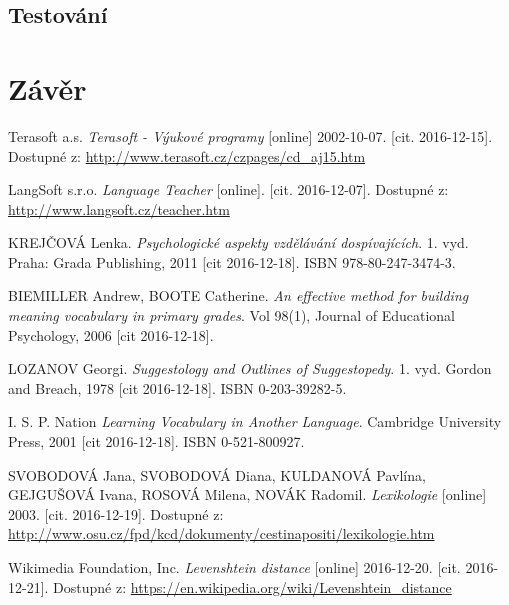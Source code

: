 \documentclass[a4paper,11pt,titlepage,fleqn]{article}
\begin{document}
    \subsection{Testování}


\newpage
\section{Závěr}


\newpage
\begin{thebibliography}{99}
    

        Terasoft a.s. \textit{Terasoft - Výukové programy} [online] 2002-10-07. [cit. 2016-12-15]. Dostupné z: \url{http://www.terasoft.cz/czpages/cd_aj15.htm}
    
        LangSoft s.r.o. \textit{Language Teacher} [online]. [cit. 2016-12-07]. Dostupné z: \url{http://www.langsoft.cz/teacher.htm}

        KREJČOVÁ Lenka. \textit{Psychologické aspekty vzdělávání dospívajících}. 1. vyd. Praha: Grada Publishing, 2011 [cit 2016-12-18]. ISBN 978-80-247-3474-3.

        BIEMILLER Andrew, BOOTE Catherine. \textit{An effective method for building meaning vocabulary in primary grades}. Vol 98(1), Journal of Educational Psychology, 2006 [cit 2016-12-18].

        LOZANOV Georgi. \textit{Suggestology and Outlines of Suggestopedy}. 1. vyd. Gordon and Breach, 1978 [cit 2016-12-18]. ISBN 0-203-39282-5.

        I. S. P. Nation \textit{Learning Vocabulary in Another Language}. Cambridge University Press, 2001 [cit 2016-12-18]. ISBN 0-521-800927.

        SVOBODOVÁ Jana, SVOBODOVÁ Diana, KULDANOVÁ Pavlína, GEJGUŠOVÁ Ivana, ROSOVÁ Milena, NOVÁK Radomil. \textit{Lexikologie} [online] 2003. [cit. 2016-12-19]. Dostupné z: \url{http://www.osu.cz/fpd/kcd/dokumenty/cestinapositi/lexikologie.htm}

         Wikimedia Foundation, Inc. \textit{Levenshtein distance} [online] 2016-12-20. [cit. 2016-12-21]. Dostupné z: \url{https://en.wikipedia.org/wiki/Levenshtein_distance}
        

\end{thebibliography}
\end{document}
